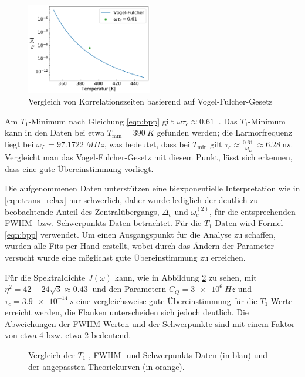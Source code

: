 \begin{figure}
	\vspace{-20pt}
	\begin{center}
		\includegraphics[width=0.49\textwidth]{graphics/zwischenbericht/tau_c_arrhenius_vogel_fulcher.pdf}
	\end{center}
	\vspace{-20pt}
	\caption{Vergleich von Korrelationszeiten basierend auf Vogel-Fulcher-Gesetz \label{fig:korrelationszeiten}}
\end{figure}
Am $T_1$-Minimum nach Gleichung \eqref{eqn:bpp} gilt $\omega \tau_c \approx \SI{0.61}{}$ \cite[S. 629]{omegatau061}. Das $T_1$-Minimum kann in den Daten bei etwa $T_\text{min} = \SI{390}{K}$ gefunden werden; die Larmorfrequenz liegt bei $\omega_L = \SI{97.1722}{MHz}$, was bedeutet, dass bei $T_\text{min}$ gilt $\tau_c \approx \frac{\SI{0.61}{}}{\omega_L} \approx \SI{6.28}{\nano s}$. Vergleicht man das Vogel-Fulcher-Gesetz mit diesem Punkt, lässt sich erkennen, dass eine gute Übereinstimmung vorliegt.


Die aufgenommenen Daten unterstützen eine biexponentielle Interpretation wie in \eqref{eqn:trans_relax} nur schwerlich, daher wurde lediglich der deutlich zu beobachtende Anteil des Zentralübergangs, $\Delta_c$ und $\omega_c^{(2)}$, für die entsprechenden FWHM- bzw. Schwerpunkts-Daten betrachtet. Für die $T_1$-Daten wird Formel \eqref{eqn:bpp} verwendet. Um einen Ausgangspunkt für die Analyse zu schaffen, wurden alle Fits per Hand erstellt, wobei durch das Ändern der Parameter versucht wurde eine möglichst gute Übereinstimmung zu erreichen.

Für die Spektraldichte $J(\omega)$ kann, wie in Abbildung \ref{fig:triple_vergleich} zu sehen, mit $\eta^2 = 42 - 24 \sqrt{3} \approx \SI{0.43}{}$ \cite{caer} und den Parametern $C_Q = \SI{3e6}{Hz}$ und $\tau_c = \SI{3.9e-14}{s}$ eine vergleichsweise gute Übereinstimmung für die $T_1$-Werte erreicht werden, die Flanken unterscheiden sich jedoch deutlich. Die Abweichungen der FWHM-Werten und der Schwerpunkte sind mit einem Faktor von etwa 4 bzw. etwa 2 bedeutend.
\begin{figure}[htbp]
	\caption{Vergleich der $T_1$-, FWHM- und Schwerpunkts-Daten (in blau) und der angepassten Theoriekurven (in orange). \label{fig:triple_vergleich}}
\end{figure}

